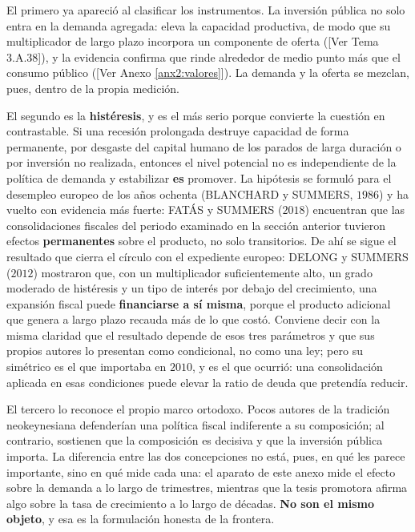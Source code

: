\documentclass[10pt,a4paper]{article}
\newcommand{\authorfont}[1]{{\fontfamily{EBGaramond-TLF}\selectfont #1}}
\newcounter{anexo}
\begin{document}
El primero ya apareció al clasificar los instrumentos. La inversión pública no solo entra en la demanda agregada: eleva la capacidad productiva, de modo que su multiplicador de largo plazo incorpora un componente de oferta ([\authorfont{Ver Tema 3.A.38}]), y la evidencia confirma que rinde alrededor de medio punto más que el consumo público ([\authorfont{Ver Anexo \ref{anx2:valores}}]). La demanda y la oferta se mezclan, pues, dentro de la propia medición.

El segundo es la \textbf{histéresis}, y es el más serio porque convierte la cuestión en contrastable. Si una recesión prolongada destruye capacidad de forma permanente, por desgaste del capital humano de los parados de larga duración o por inversión no realizada, entonces el nivel potencial no es independiente de la política de demanda y estabilizar \textbf{es} promover. La hipótesis se formuló para el desempleo europeo de los años ochenta (BLANCHARD y SUMMERS, $1986$) y ha vuelto con evidencia más fuerte: FATÁS y SUMMERS ($2018$) encuentran que las consolidaciones fiscales del periodo examinado en la sección anterior tuvieron efectos \textbf{permanentes} sobre el producto, no solo transitorios. De ahí se sigue el resultado que cierra el círculo con el expediente europeo: DELONG y SUMMERS ($2012$) mostraron que, con un multiplicador suficientemente alto, un grado moderado de histéresis y un tipo de interés por debajo del crecimiento, una expansión fiscal puede \textbf{financiarse a sí misma}, porque el producto adicional que genera a largo plazo recauda más de lo que costó. Conviene decir con la misma claridad que el resultado depende de esos tres parámetros y que sus propios autores lo presentan como condicional, no como una ley; pero su simétrico es el que importaba en $2010$, y es el que ocurrió: una consolidación aplicada en esas condiciones puede elevar la ratio de deuda que pretendía reducir.

El tercero lo reconoce el propio marco ortodoxo. Pocos autores de la tradición neokeynesiana defenderían una política fiscal indiferente a su composición; al contrario, sostienen que la composición es decisiva y que la inversión pública importa. La diferencia entre las dos concepciones no está, pues, en qué les parece importante, sino en qué mide cada una: el aparato de este anexo mide el efecto sobre la demanda a lo largo de trimestres, mientras que la tesis promotora afirma algo sobre la tasa de crecimiento a lo largo de décadas. \textbf{No son el mismo objeto}, y esa es la formulación honesta de la frontera.
\end{document}
